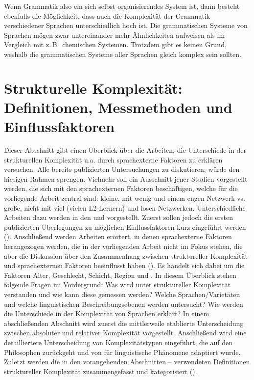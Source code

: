 \noindent
Wenn Grammatik also ein sich selbst organisierendes System ist, dann besteht ebenfalls die Möglichkeit, dass auch die Komplexität der Grammatik verschiedener Sprachen unterschiedlich hoch ist. Die grammatischen Systeme von Sprachen mögen zwar untereinander mehr Ähnlichkeiten aufweisen als im Vergleich mit z.\,B.\ chemischen Systemen. Trotzdem gibt es keinen Grund, weshalb die grammatischen Systeme aller Sprachen gleich komplex sein sollten.

\section{Strukturelle Komplexität: Definitionen, Messmethoden und Einflussfaktoren}\label{2.2}%

Dieser Abschnitt gibt einen Überblick über die Arbeiten, die Unterschiede in der strukturellen Komplexität u.a. durch sprachexterne Faktoren zu erklären versuchen. Alle bereits publizierten Untersuchungen zu diskutieren, würde den hiesigen Rahmen sprengen. Vielmehr soll ein Ausschnitt jener Studien vorgestellt werden, die sich mit den sprachexternen Faktoren beschäftigen, welche für die vorliegende Arbeit zentral sind: kleine,  mit wenig  und einem engen Netzwerk vs. große, nicht  mit viel  (vielen L2-Ler\-nern) und losen Netzwerken. Unterschiedliche Arbeiten dazu werden in den   und  vorgestellt. Zuerst sollen jedoch die ersten publizierten Überlegungen zu möglichen Einflussfaktoren kurz eingeführt werden (). Anschließend werden Arbeiten erörtert, in denen sprachexterne Faktoren herangezogen werden, die in der vorliegenden Arbeit nicht im Fokus stehen, die aber die Diskussion über den Zusammenhang zwischen struktureller Komplexität und sprachexternen Faktoren beeinflusst haben (). Es handelt sich dabei um die Faktoren Alter, Geschlecht, Schicht, Region und . In diesem Überblick stehen folgende Fragen im Vordergrund: Was wird unter struktureller Komplexität verstanden und wie kann diese gemessen werden? Welche Sprachen/Varietäten und welche linguistischen Beschreibungsebenen werden untersucht? Wie werden die Unterschiede in der Komplexität von Sprachen erklärt? In einem abschließenden Abschnitt wird zuerst die mittlerweile etablierte Unterscheidung zwischen absoluter und relativer Komplexität vorgestellt. Anschließend wird eine detailliertere Unterscheidung von Komplexitätstypen eingeführt, die auf den Philosophen \citet{Rescher1998} zurückgeht und von \citet{MiestamoSinnemäkiKarlsson2008} für linguistische Phänomene adaptiert wurde. Zuletzt werden die in den vorangehenden Abschnitten – verwendeten Definitionen struktureller Komplexität zusammengefasst und kategorisiert ().

